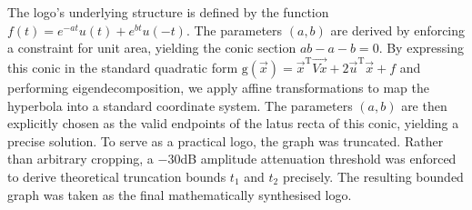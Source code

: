 \documentclass{article}
\numberwithin{equation}{section}
\numberwithin{figure}{section}
\begin{document}


The logo's underlying structure is defined by the function $f(t) = e^{-at}u(t) + e^{bt}u(-t)$. The parameters $(a,b)$ are derived by enforcing a constraint for unit area, yielding the conic section $ab - a - b = 0$. By expressing this conic in the standard quadratic form $\text{g}(\vec{x}) = \vec{x}^\text{T}\vec{Vx} + 2\vec{u}^\text{T}\vec{x} + f$ and performing eigendecomposition, we apply affine transformations to map the hyperbola into a standard coordinate system. The parameters $(a,b)$ are then explicitly chosen as the valid endpoints of the latus recta of this conic, yielding a precise solution.%
To serve as a practical logo, the graph was truncated. Rather than arbitrary cropping, a $-30$dB amplitude attenuation threshold was enforced to derive theoretical truncation bounds $t_1$ and $t_2$ precisely. The resulting bounded graph was taken as the final mathematically synthesised logo.
\end{document}
